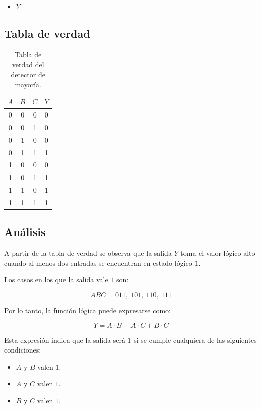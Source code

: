\documentclass[a4paper,12pt]{article}
\begin{document}
	\begin{itemize}
		\item $Y$
	\end{itemize}
	
	\subsection{Tabla de verdad}
	
	\begin{table}[h]
		\centering
		\begin{tabular}{|c|c|c|c|}
			\hline
			$A$ & $B$ & $C$ & $Y$ \\ \hline
			0 & 0 & 0 & 0 \\ \hline
			0 & 0 & 1 & 0 \\ \hline
			0 & 1 & 0 & 0 \\ \hline
			0 & 1 & 1 & 1 \\ \hline
			1 & 0 & 0 & 0 \\ \hline
			1 & 0 & 1 & 1 \\ \hline
			1 & 1 & 0 & 1 \\ \hline
			1 & 1 & 1 & 1 \\ \hline
		\end{tabular}
		\caption{Tabla de verdad del detector de mayoría.}
		\label{tab:ej3_mayoria}
	\end{table}
	
	\subsection{Análisis}
	
	A partir de la tabla de verdad se observa que la salida $Y$ toma el valor lógico alto cuando al menos dos entradas se encuentran en estado lógico $1$.
	
	Los casos en los que la salida vale $1$ son:
	
	\[
	ABC = 011,\ 101,\ 110,\ 111
	\]
	
	Por lo tanto, la función lógica puede expresarse como:
	
	\[
	Y = A \cdot B + A \cdot C + B \cdot C
	\]
	
	Esta expresión indica que la salida será $1$ si se cumple cualquiera de las siguientes condiciones:
	
	\begin{itemize}
		\item $A$ y $B$ valen $1$.
		\item $A$ y $C$ valen $1$.
		\item $B$ y $C$ valen $1$.
	\end{itemize}
	
\end{document}
